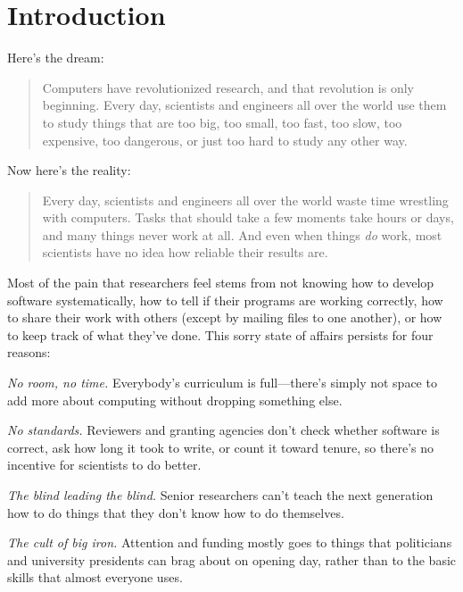 \documentclass{book}
\begin{document}
\frontmatter


\tableofcontents

\mainmatter

\chapter{Introduction}\label{introduction}

Here's the dream:

\begin{quote}
Computers have revolutionized research, and that revolution is only
beginning. Every day, scientists and engineers all over the world use
them to study things that are too big, too small, too fast, too slow,
too expensive, too dangerous, or just too hard to study any other way.
\end{quote}

Now here's the reality:

\begin{quote}
Every day, scientists and engineers all over the world waste time
wrestling with computers. Tasks that should take a few moments take
hours or days, and many things never work at all. And even when things
\emph{do} work, most scientists have no idea how reliable their results
are.
\end{quote}

Most of the pain that researchers feel stems from not knowing how to
develop software systematically, how to tell if their programs are
working correctly, how to share their work with others (except by
mailing files to one another), or how to keep track of what they've
done. This sorry state of affairs persists for four reasons:

\begin{swcitemize}
\item
  \emph{No room, no time.} Everybody's curriculum is full---there's
  simply not space to add more about computing without dropping
  something else.
\item
  \emph{No standards.} Reviewers and granting agencies don't check
  whether software is correct, ask how long it took to write, or count
  it toward tenure, so there's no incentive for scientists to do better.
\item
  \emph{The blind leading the blind.} Senior researchers can't teach the
  next generation how to do things that they don't know how to do
  themselves.
\item
  \emph{The cult of big iron.} Attention and funding mostly goes to
  things that politicians and university presidents can brag about on
  opening day, rather than to the basic skills that almost everyone
  uses.
\end{swcitemize}
\end{document}
